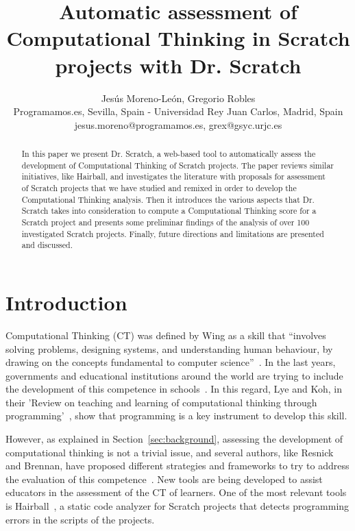 \documentclass[a4paper,11pt]{article}
\title{Automatic assessment of Computational Thinking in Scratch projects with Dr. Scratch}
\author{Jesús Moreno-León, Gregorio Robles \\ Programamos.es, Sevilla, Spain - Universidad Rey Juan Carlos, Madrid, Spain \\ jesus.moreno@programamos.es, grex@gsyc.urjc.es}
\begin{document}
\maketitle

\begin{abstract}
In this paper we present Dr. Scratch, a web-based tool to automatically assess the development of Computational Thinking of Scratch projects. The paper reviews similar initiatives, like Hairball, and investigates the literature with proposals for assessment of Scratch projects that we have studied and remixed in order to develop the Computational Thinking analysis. Then it introduces the various aspects that Dr. Scratch takes into consideration to compute a Computational Thinking score for a Scratch project and presents some preliminar findings of the analysis of over 100 investigated Scratch projects. Finally, future directions and limitations are presented and discussed.

\end{abstract}

\section{Introduction}

Computational Thinking (CT) was defined by Wing as a skill that ``involves solving problems, designing systems, and understanding human behaviour, by drawing on the concepts fundamental to computer science''~\cite{wing2006computational}. In the last years, governments and educational institutions around the world are trying to include the development of this competence in schools~\cite{euschoolnet}. In this regard, Lye and Koh, in their 'Review on teaching and learning of computational thinking through programming'~\cite{lye2014review}, show that programming is a key instrument to develop this skill.

However, as explained in Section~\ref{sec:background}, assessing the development of computational thinking is not a trivial issue, and several authors, like Resnick and Brennan, have proposed different strategies and frameworks to try to address the evaluation of this competence~\cite{brennan2012new}. New tools are being developed to assist educators in the assessment of the CT of learners. One of the most relevant tools is Hairball~\cite{boe2013hairball}, a static code analyzer for Scratch projects that detects programming errors in the scripts of the projects.
\end{document}
